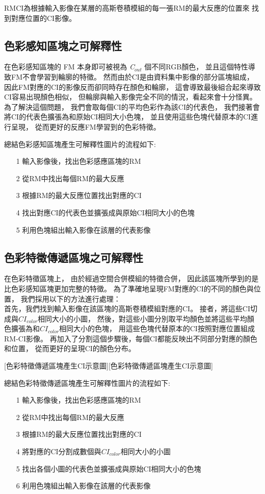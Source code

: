 \documentclass[class=NCU_thesis, crop=false]{standalone}
\begin{document}
	RM\-CI為根據輸入影像在某層的高斯卷積模組的每一張RM的最大反應的位置來
	找到對應位置的CI影像。

	\subsection{色彩感知區塊之可解釋性}
	在色彩感知區塊的 FM 本身即可被視為 \textit{C}$_{out}$ 個不同RGB顏色，
	並且這個特性導致FM不會學習到輪廓的特徵。
	然而由於CI是由資料集中影像的部分區塊組成，
	因此FM對應的CI的影像反而卻同時存在顏色和輪廓，
	這會導致最後組合起來導致CI容易出現顏色相似，
	但輪廓與輸入影像完全不同的情況，看起來會十分怪異。
	為了解決這個問題，
	我們會取每個CI的平均色彩作為該CI的代表色，
	我們接著會將CI的代表色擴張為和原始CI相同大小色塊，
	並且使用這些色塊代替原本的CI進行呈現，
	從而更好的反應FM學習到的色彩特徵。

	總結色彩感知區塊產生可解釋性圖片的流程如下:
	\begin{itemize}
		\item [1]
		輸入影像後，找出色彩感應區塊的RM
		\item [2]
		從RM中找出每個RM的最大反應
		\item [3]
		根據RM的最大反應位置找出對應的CI
		\item [4]
		找出對應CI的代表色並擴張成與原始CI相同大小的色塊
		\item [5]
		利用色塊組出輸入影像在該層的代表影像
	\end{itemize}

	\subsection{色彩特徵傳遞區塊之可解釋性}
	在色彩特徵區塊上，
	由於經過空間合併模組的特徵合併，
	因此該區塊所學到的是比色彩感知區塊更加完整的特徵。
	為了準確地呈現FM對應的CI的不同的顏色與位置，
	我們採用以下的方法進行處理：\\
	首先，我們找到輸入影像在該區塊的高斯卷積模組對應的CI。
	接者，將這些CI切成與$CI_{color}$相同大小的小圖，
	然後，對這些小圖分別取平均顏色並將這些平均顏色擴張為和$CI_{color}$相同大小的色塊，
	用這些色塊代替原本的CI按照對應位置組成RM-CI影像。
	再加入了分割這個步驟後，每個CI都能反映出不同部分對應的顏色和位置，
	從而更好的呈現CI的顏色分布。

	[色彩特徵傳遞區塊產生CI示意圖][色彩特徵傳遞區塊產生CI示意圖]

	總結色彩特徵傳遞區塊產生可解釋性圖片的流程如下:
	\begin{itemize}
		\item [1]
		輸入影像後，找出色彩感應區塊的RM
		\item [2]
		從RM中找出每個RM的最大反應
		\item [3]
		根據RM的最大反應位置找出對應的CI
		\item [4]
		將對應的CI分割成數個與$CI_{color}$相同大小的小圖
		\item [5]
		找出各個小圖的代表色並擴張成與原始CI相同大小的色塊
		\item [6]
		利用色塊組出輸入影像在該層的代表影像
	\end{itemize}
\end{document}
